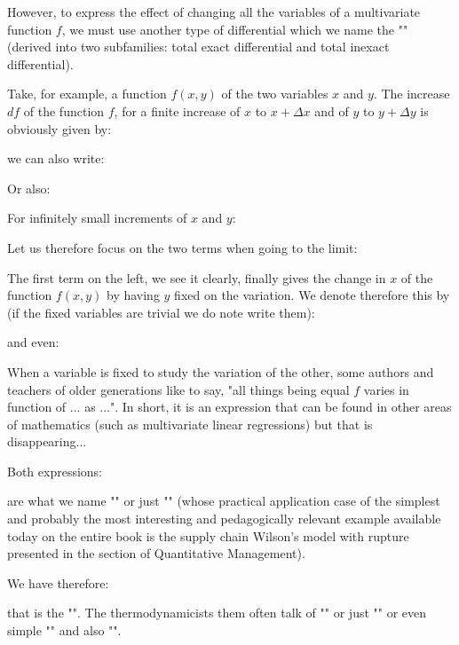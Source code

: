 	However, to express the effect of changing all the variables of a multivariate function $f$, we must use another type of differential which we name the "" (derived into two subfamilies: total exact differential and total inexact differential).
	
	Take, for example, a function $f(x, y)$ of the two variables $x$ and $y$. The increase $df$ of the function $f$, for a finite increase of $x$ to $x+\Delta x$ and of $y$ to $y+\Delta y$ is obviously given by:
	
	we can also write:
	
	Or also:
	
	For infinitely small increments of $x$ and $y$:
	
	Let us therefore focus on the two terms when going to the limit:
	
	The first term on the left, we see it clearly, finally gives the change in $x$ of the function $f(x, y)$ by having $y$ fixed on the variation. We denote therefore this by (if the fixed variables are trivial we do note write them):
	
	and even:
	
	\begin{tcolorbox}[title=Remark,colframe=black,arc=10pt]
When a variable is fixed to study the variation of the other, some authors and teachers of older generations like to say, "all things being equal $f$ varies in function of ... as ...". In short, it is an expression that can be found in other areas of mathematics (such as multivariate linear regressions) but that is disappearing...
	\end{tcolorbox}
	Both expressions:
	
	are what we name "" or just "" (whose practical application case of the simplest and probably the most interesting and pedagogically relevant example available today on the entire book is the supply chain Wilson's model with rupture presented in the section of Quantitative Management).
	
	We have therefore:
	
	that is the "". The thermodynamicists them often talk of "" or just "" or even simple "" and also "".
	

